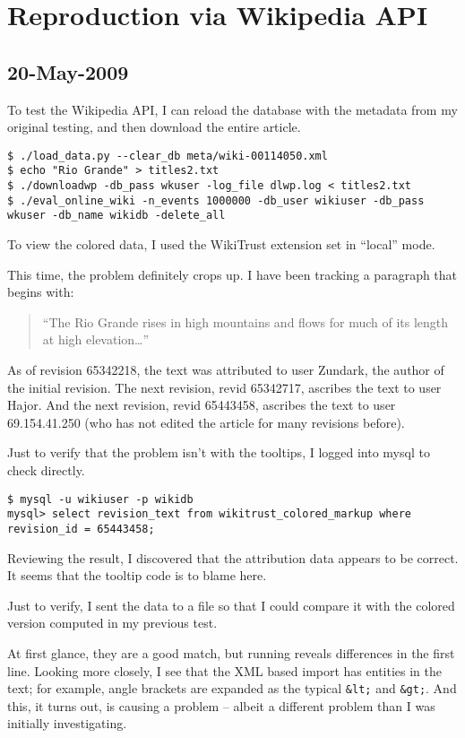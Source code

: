 \section{Reproduction via Wikipedia API}

\subsection{20-May-2009}

To test the Wikipedia API, I can reload the database with the
metadata from my original testing, and then download the
entire  article.
\begin{verbatim}
$ ./load_data.py --clear_db meta/wiki-00114050.xml
$ echo "Rio Grande" > titles2.txt
$ ./downloadwp -db_pass wkuser -log_file dlwp.log < titles2.txt
$ ./eval_online_wiki -n_events 1000000 -db_user wikiuser -db_pass wkuser -db_name wikidb -delete_all
\end{verbatim}
To view the colored data, I used the WikiTrust extension
set in ``local'' mode.

This time, the problem definitely crops up.
I have been tracking a paragraph that begins with:
\begin{quote}
``The Rio Grande rises in high mountains and flows for
much of its length at high elevation\ldots''
\end{quote}
As of revision 65342218, the text was attributed to
user Zundark, the author of the initial revision.
The next revision, revid 65342717, ascribes the text
to user Hajor.
And the next revision, revid 65443458, ascribes the text
to user 69.154.41.250 (who has not edited the article for
many revisions before).

Just to verify that the problem isn't with the tooltips,
I logged into mysql to check directly.
\begin{verbatim}
$ mysql -u wikiuser -p wikidb
mysql> select revision_text from wikitrust_colored_markup where revision_id = 65443458;
\end{verbatim}
Reviewing the result, I discovered that the attribution
data appears to be correct.
It seems that the tooltip code is to blame here.

Just to verify, I sent the data to a file so that I
could compare it with the colored version computed
in my previous test.

At first glance, they are a good match, but running 
reveals differences in the first line.
Looking more closely, I see that the XML based import
has entities in the text; for example, angle brackets
are expanded as the typical \texttt{\&lt;} and \texttt{\&gt;}.
And this, it turns out, is causing a problem -- albeit a
different problem than I was initially investigating.

